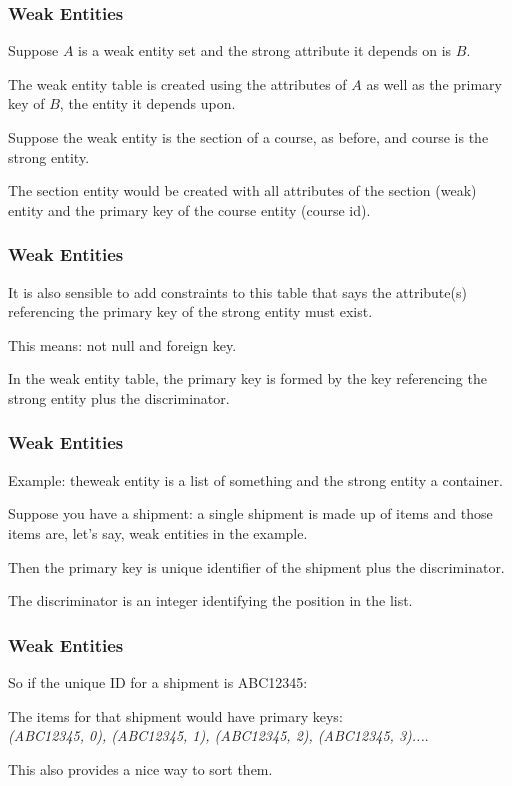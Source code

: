 \begin{frame}
\frametitle{Weak Entities}

Suppose $A$ is a weak entity set and the strong attribute it depends on is $B$. 

The weak entity table is created using the attributes of $A$ as well as the primary key of $B$, the entity it depends upon. 

Suppose the weak entity is the section of a course, as before, and course is the strong entity. 

The section entity would be created with all attributes of the section (weak) entity and the primary key  of the course entity (course id).


\end{frame}




\begin{frame}
\frametitle{Weak Entities}

It is also sensible to add constraints to this table that says the attribute(s) referencing the primary key of the strong entity  must exist.

This means: not null and foreign key. 

In the weak entity table, the primary key is formed by the key referencing the strong entity plus the discriminator.

\end{frame}



\begin{frame}
\frametitle{Weak Entities}

Example: theweak entity is a list of something and the strong entity a container.

Suppose you have a shipment: a single shipment is made up of items and those items are, let's say, weak entities in the example. 

Then the primary key is unique identifier of the shipment plus the discriminator. 

The discriminator is an integer identifying the position in the list. 


\end{frame}


\begin{frame}
\frametitle{Weak Entities}


So if the unique ID for a shipment is ABC12345:

The items for that shipment would have primary keys:\\
\quad \textit{(ABC12345, 0), (ABC12345, 1), (ABC12345, 2), (ABC12345, 3)...}. 

This also provides a nice way to sort them.

\end{frame}




